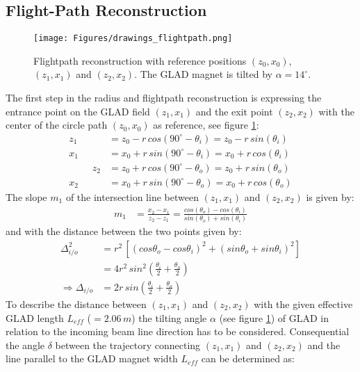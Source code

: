 \begin{appendices}
\section{Flight-Path Reconstruction}\label{app:flightpath}
\begin{figure}[h!]
    \centering
    \texttt{[image: Figures/drawings\_flightpath.png]}
    \caption{
        Flightpath reconstruction with reference positions $(z_0,x_0)$, $(z_1,x_1)$ and $(z_2,x_2)$. The GLAD magnet is tilted by $\alpha = 14^{\circ}$.}
    \label{fig:draw_flight}
\end{figure}
The first step in the radius and flightpath reconstruction is expressing the entrance point on the GLAD field $(z_1,x_1)$ and the exit point $(z_2,x_2)$ with the center of the circle path $(z_0,x_0)$ as reference, see figure \ref{fig:draw_flight}:
\begin{align*}
z_1 &= z_0 -r\,cos(90^{\circ}-\theta_i) = z_0 -r\,sin(\theta_i)\\
x_1 &= x_0 + r\,sin(90^{\circ}-\theta_i) = x_0 + r\,cos(\theta_i)\\
\hspace{1cm}
z_2 &= z_0 + r\,cos(90^{\circ}-\theta_o) = z_0 + r\,sin(\theta_o)\\
x_2 &= x_0 + r\,sin(90^{\circ}-\theta_o) = x_0 + r\,cos(\theta_o) 
\end{align*}
The slope $m_1$ of the intersection line between $(z_1,x_1)$ and $(z_2,x_2)$ is given by:
\begin{align*}
m_1 &= \frac{x_2-x_1}{z_2 -z_1} = \frac{cos(\theta_o) - cos(\theta_i)}{sin(\theta_o)+sin(\theta_i)}
\end{align*}
and with the distance between the two points given by:
\begin{align*}
\Delta^2_{i/o} &= r^2 \, \left[(cos\theta_o - cos\theta_i)^2 + (sin\theta_o + sin\theta_i)^2 \right]\\
	       &= 4r^2\,sin^2(\frac{\theta_i}{2} +\frac{\theta_o}{2} )\\
\Rightarrow \Delta_{i/o} &= 2r\,sin(\frac{\theta_i}{2} +\frac{\theta_o}{2})
\end{align*}
To describe the distance between $(z_1,x_1)$ and $(z_2,x_2)$ with the given effective GLAD length $L_{eff}$ ($= 2.06\,m$) the tilting angle $\alpha$ (see figure \ref{fig:draw_flight}) of GLAD in relation to the incoming beam line direction has to be considered. Consequential the angle $\delta$ between the trajectory connecting $(z_1,x_1)$ and $(z_2,x_2)$ and the line parallel to the GLAD magnet width $L_{eff}$ can be determined as:

\end{appendices}
